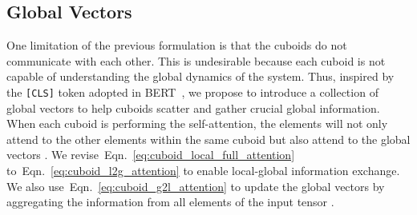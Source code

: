 \documentclass{article}
\newcommand{\eqnref}[1]{Eqn.~\ref{#1}}
\begin{document}
\begin{table}[!tb]
\vskip -0.4cm
\caption{Configurations of the cuboid attention patterns explored in the paper. 
The input tensor has shape . 
If ``'' or ``'' is not given, we use  and  by default.
When stacking multiple cuboid attention layers, each layer will be coupled with layer normalization layers and feed-forward network as in the Pre-LN Transformer~\cite{xiong2020layer}. 
The first row shows the configuration of the generic cuboid attention.} 
\label{table:cuboid_attention_patterns}
\begin{center}
 \end{center}
\vskip -0.5cm
\end{table}



\subsection{Global Vectors}
One limitation of the previous formulation is that the cuboids do not communicate with each other. This is undesirable because each cuboid is not capable of understanding the global dynamics of the system. Thus, inspired by the \texttt{[CLS]} token adopted in BERT~\cite{devlin2018bert,zaheer2020big}, we propose to introduce a collection of  global vectors  to help cuboids scatter and gather crucial global information. When each cuboid is performing the self-attention, the elements will not only attend to the other elements within the same cuboid but also attend to the global vectors . 
We revise~\eqnref{eq:cuboid_local_full_attention} to~\eqnref{eq:cuboid_l2g_attention} to enable local-global information exchange. 
We also use~\eqnref{eq:cuboid_g2l_attention} to update the global vectors  by aggregating the information from all elements of the input tensor .
\end{document}
